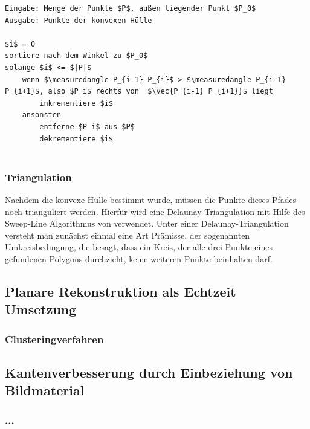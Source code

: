 \begin{lstlisting}[mathescape,caption=Graham Scan Algorithmus, label=lst:graham-scan]
Eingabe: Menge der Punkte $P$, außen liegender Punkt $P_0$
Ausgabe: Punkte der konvexen Hülle

$i$ = 0
sortiere nach dem Winkel zu $P_0$
solange $i$ <= $|P|$
    wenn $\measuredangle P_{i-1} P_{i}$ > $\measuredangle P_{i-1} P_{i+1}$, also $P_i$ rechts von  $\vec{P_{i-1} P_{i+1}}$ liegt
        inkrementiere $i$
    ansonsten
        entferne $P_i$ aus $P$
        dekrementiere $i$
    
\end{lstlisting} 


\subsubsection{Triangulation}

Nachdem die konvexe Hülle bestimmt wurde, müssen die Punkte dieses Pfades noch trianguliert werden. Hierfür wird eine Delaunay-Triangulation mit Hilfe des Sweep-Line Algorithmus von \citet{domiter2008sweep} verwendet. Unter einer Delaunay-Triangulation versteht man zunächst einmal eine Art Prämisse, der sogenannten Umkreisbedingung, die besagt, dass ein Kreis, der alle drei Punkte eines gefundenen Polygons durchzieht, keine weiteren Punkte beinhalten darf.

\subsection{Planare Rekonstruktion als Echtzeit Umsetzung}

\subsubsection{Clusteringverfahren}

\subsection{Kantenverbesserung durch Einbeziehung von Bildmaterial}

\subsubsection{...}